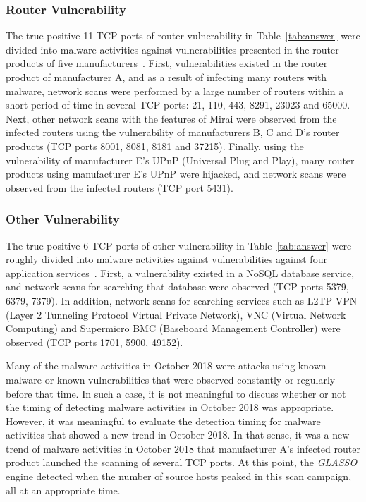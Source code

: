 \documentclass[conference]{IEEEtran}
\begin{document}
\subsubsection{Router Vulnerability}
The true positive 11 TCP ports of router vulnerability in Table~\ref{tab:answer} were divided into malware activities against vulnerabilities presented in the router products of five manufacturers~\cite{Huawei,Netlab_BCM,Netlab_MikroTik}.
First, vulnerabilities existed in the router product of manufacturer A, and as a result of infecting many routers with malware, network scans were performed by a large number of routers within a short period of time in several TCP ports: 21, 110, 443, 8291, 23023 and 65000.
Next, other network scans with the features of Mirai were observed from the infected routers using the vulnerability of manufacturers B, C and D's router products (TCP ports 8001, 8081, 8181 and 37215).
Finally, using the vulnerability of manufacturer E's UPnP (Universal Plug and Play), many router products using manufacturer E's UPnP were hijacked, and network scans were observed from the infected routers (TCP port 5431).



\subsubsection{Other Vulnerability}
The true positive 6 TCP ports of other vulnerability in Table~\ref{tab:answer} were roughly divided into malware activities against vulnerabilities against four application services~\cite{Imperva}.
First, a vulnerability existed in a NoSQL database service, and network scans for searching that database were observed (TCP ports 5379, 6379, 7379).
In addition, network scans for searching services such as L2TP VPN (Layer 2 Tunneling Protocol Virtual Private Network), VNC (Virtual Network Computing) and Supermicro BMC (Baseboard Management Controller) were observed (TCP ports 1701, 5900, 49152).


Many of the malware activities in October 2018 were attacks using known malware or known vulnerabilities that were observed constantly or regularly before that time.
In such a case, it is not meaningful to discuss whether or not the timing of detecting malware activities in October 2018 was appropriate.
However, it was meaningful to evaluate the detection timing for malware activities that showed a new trend in October 2018.
In that sense, it was a new trend of malware activities in October 2018 that manufacturer A's infected router product launched the scanning of several TCP ports.
At this point, the {\it GLASSO} engine detected when the number of source hosts peaked in this scan campaign, all at an appropriate time.
\end{document}
